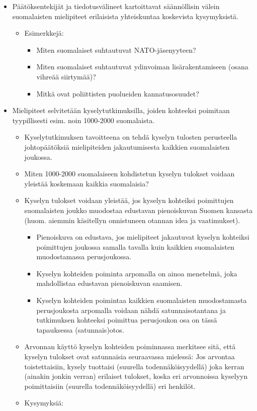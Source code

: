 \documentclass[
]{book}
\providecommand{\tightlist}{%
  \setlength{\itemsep}{0pt}\setlength{\parskip}{0pt}}
\begin{document}
\begin{itemize}
\tightlist
\item
  Päätöksentekijät ja tiedotusvälineet kartoittavat säännöllisin välein suomalaisten mielipiteet erilaisista yhteiskuntaa koskevista kysymyksistä.

  \begin{itemize}
  \tightlist
  \item
    Esimerkkejä:

    \begin{itemize}
    \tightlist
    \item
      Miten suomalaiset suhtautuvat NATO-jäsenyyteen?
    \item
      Miten suomalaiset suhtautuvat ydinvoiman lisärakentamiseen (osana vihreää siirtymää)?
    \item
      Mitkä ovat poliittisten puolueiden kannatusosuudet?
    \end{itemize}
  \end{itemize}
\item
  Mielipiteet selvitetään kyselytutkimuksilla, joiden kohteeksi poimitaan tyypillisesti esim. noin 1000-2000 suomalaista.

  \begin{itemize}
  \tightlist
  \item
    Kyselytutkimuksen tavoitteena on tehdä kyselyn tulosten perusteella johtopäätöksiä mielipiteiden jakautumisesta kaikkien suomalaisten joukossa.
  \item
    Miten 1000-2000 suomalaiseen kohdistetun kyselyn tulokset voidaan yleistää koskemaan kaikkia suomalaisia?
  \item
    Kyselyn tulokset voidaan yleistää, jos kyselyn kohteiksi poimittujen suomalaisten joukko muodostaa edustavan pienoiskuvan Suomen kansasta (huom. aiemmin käsitellyn onnistuneen otannan idea ja vaatimukset).

    \begin{itemize}
    \tightlist
    \item
      Pienoiskuva on edustava, jos mielipiteet jakautuvat kyselyn kohteiksi poimittujen joukossa samalla tavalla kuin kaikkien suomalaisten muodostamassa perusjoukossa.
    \item
      Kyselyn kohteiden poiminta arpomalla on ainoa menetelmä, joka mahdollistaa edustavan pienoiskuvan saamisen.
    \item
      Kyselyn kohteiden poimintaa kaikkien suomalaisten muodostamasta perusjoukosta arpomalla voidaan nähdä satunnaisotantana ja tutkimuksen kohteeksi poimittua perusjoukon osa on tässä tapauksessa (satunnais)otos.
    \end{itemize}
  \item
    Arvonnan käyttö kyselyn kohteiden poiminnassa merkitsee sitä, että kyselyn tulokset ovat satunnaisia seuraavassa mielessä: Jos arvontaa toistettaisiin, kysely tuottaisi (suurella todennäköisyydellä) joka kerran (ainakin jonkin verran) erilaiset tulokset, koska eri arvonnoissa kyselyyn poimittaisiin (suurella todennäköisyydellä) eri henkilöt.
  \item
    Kysymyksiä:


\end{itemize}
\end{itemize}
\end{document}
